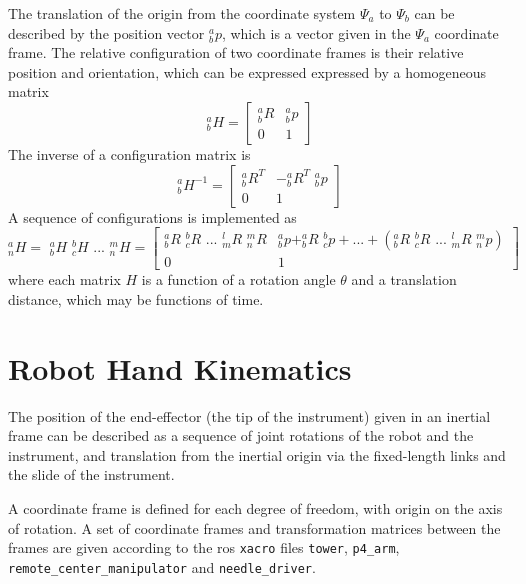 The translation of the origin from the coordinate system $\Psi_a$ to $\Psi_b$ can be described by the position vector $^a_bp$, which is a vector given in the $\Psi_a$ coordinate frame.
The relative configuration of two coordinate frames is their relative position and orientation, which can be expressed expressed by a homogeneous matrix
\begin{equation}
^a_bH = 
\begin{bmatrix}
^a_bR & ^a_bp\\
0 & 1
\end{bmatrix}
\end{equation}
The inverse of a configuration matrix is
\begin{equation}
^a_bH^{-1} = 
\begin{bmatrix}
^a_bR^T & -^a_bR^T\,\,^a_bp\\
0 & 1
\end{bmatrix}
\end{equation}
A sequence of configurations is implemented as
\begin{equation}
^a_nH =\,\, ^a_bH \,\, ^b_cH \,\,...\,\, ^m_nH = 
\begin{bmatrix}
^a_bR \,\, ^b_cR \,\,...\,\, ^l_mR \,\,^m_nR & ^a_bp + ^a_bR \,\, ^b_cp + ... + (^a_bR\,\, ^b_cR \,\,...\,\, ^l_mR \,\, ^m_np )\\
0 & 1
\end{bmatrix}
\end{equation}
where each matrix $H$ is a function of a rotation angle $\theta$ and a translation distance, which may be functions of time.


 



\section{Robot Hand Kinematics}
The position of the end-effector (the tip of the instrument) given in an inertial frame can be described as a sequence of joint rotations of the robot and the instrument, and translation from the inertial origin via the fixed-length links and the slide of the instrument.

A coordinate frame is defined for each degree of freedom, with origin on the axis of rotation. A set of coordinate frames and transformation matrices between the frames are given according to the \gls{ros} \texttt{xacro} files \texttt{tower}, \texttt{p4\_arm}, \texttt{remote\_center\_manipulator} and \texttt{needle\_driver}.

